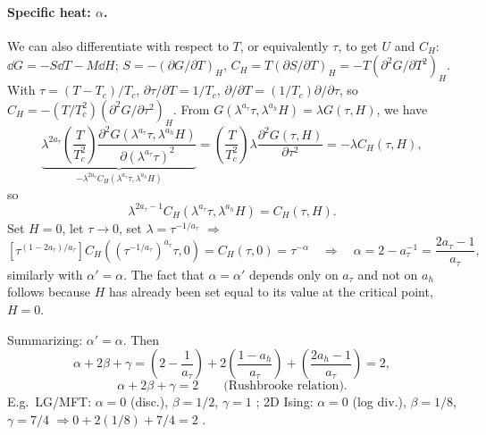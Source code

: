 \paragraph{Specific heat: $\alpha$.} We can also differentiate with respect to $T$, or equivalently
$\tau$, to get $U$ and $C_H$: $\dd G = -S\dd T - M\dd H$;
$S = -(\partial G/\partial T)_H$,
$C_H = T(\partial S/\partial T)_H = -T(\partial^2G/\partial T^2)_H$. With $\tau = (T-T_c)/T_c$,
$\partial\tau/\partial T = 1/T_c$, $\partial/\partial T = (1/T_c)\partial/\partial\tau$,
so $C_H = -(T/T_c^2)\left(\partial^2G/\partial\tau^2\right)_H$. From
$G(\lambda^{a_\tau}\tau,\lambda^{a_h}H) = \lambda G(\tau,H)$, we have
\begin{equation}
  \underbrace{\lambda^{2a_\tau}\left(\frac{T}{T_c^2}\right)\frac{\partial^2G(\lambda^{a_\tau}\tau,\lambda^{a_h}H)}{\partial(\lambda^{a_\tau}\tau)^2}}_{-\lambda^{2a_\tau}C_H(\lambda^{a_\tau}\tau,\lambda^{a_h}H)}
  = \left(\frac{T}{T_c^2}\right)\lambda\frac{\partial^2G(\tau,H)}{\partial\tau^2} = -\lambda C_H(\tau,H),
\end{equation}
so
\begin{equation}
  \lambda^{2a_\tau-1}C_H(\lambda^{a_\tau}\tau,\lambda^{a_h}H) = C_H(\tau,H).
\end{equation}
Set $H = 0$, let $\tau\to 0$, set $\lambda = \tau^{-1/a_\tau}$ $\Rightarrow$
\begin{equation}
  \left[\tau^{(1-2a_\tau)/a_\tau}\right]C_H\left((\tau^{-1/a_\tau})^{a_\tau}\tau,0\right) = C_H(\tau,0) = \tau^{-\alpha}
  \quad\Rightarrow\quad\boxed{\alpha = 2-a_\tau^{-1} = \frac{2a_\tau-1}{a_\tau}},
\end{equation}
similarly with $\alpha' = \alpha$. The fact that $\alpha = \alpha'$ depends only on $a_\tau$ and not on
$a_h$ follows because $H$ has already been set equal to its value at the critical point, $H = 0$.

Summarizing: $\boxed{\alpha' = \alpha}$. Then
\begin{equation}
  \alpha+2\beta+\gamma = \left(2-\frac{1}{a_\tau}\right) + 2\left(\frac{1-a_h}{a_\tau}\right) + \left(\frac{2a_h-1}{a_\tau}\right) = 2,
\end{equation}
\begin{equation}
  \boxed{\alpha+2\beta+\gamma = 2}\qquad\text{(Rushbrooke relation)}.
\end{equation}
E.g.\ LG/MFT: $\alpha = 0$ (disc.), $\beta = 1/2$, $\gamma = 1$ \checkmark; 2D Ising: $\alpha = 0$
(log div.), $\beta = 1/8$, $\gamma = 7/4$ $\Rightarrow 0+2(1/8)+7/4 = 2$ \checkmark.

